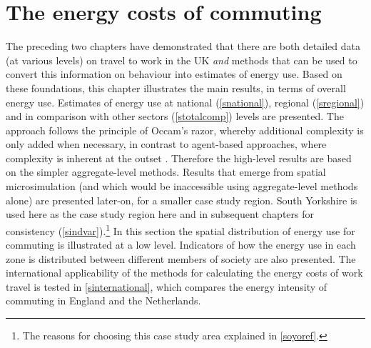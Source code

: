 
\chapter{The energy costs of commuting}
\label{Chapter6}
\fancyhead[RE,LO]{\thepage}
The preceding two chapters have demonstrated that there are both detailed
data (at various levels) on travel to work in the UK \emph{and} methods
that can be used to convert this information on behaviour
into estimates of energy use. Based
on these foundations, this chapter illustrates the main results, in terms
of overall energy use. 
Estimates of
energy use at national (\cref{snational}), regional (\cref{sregional}) and
in comparison with other sectors (\cref{stotalcomp}) levels are presented.
The approach follows the
principle of Occam's razor, whereby additional complexity is only added when
necessary, in contrast to agent-based approaches, where complexity is inherent at the
outset \citep{batty2012perspectives}.
Therefore the high-level results are based on the simpler
aggregate-level methods. Results that emerge from spatial microsimulation
(and which would be inaccessible using aggregate-level methods alone) are presented
later-on, for a smaller case study region. South Yorkshire is used here
as the case study region here and in subsequent chapters for consistency
(\cref{sindvar}).\footnote{The
reasons for choosing this case study area explained in \cref{soyoref}.
}
In this section the spatial distribution of energy use for commuting is
illustrated at a low level. Indicators of how the energy use
in each zone is distributed between different members of society are also
presented.
The international applicability of the
methods for calculating the energy costs of work travel
is tested in \cref{sinternational}, which
compares the energy intensity of commuting in England and the Netherlands.
% 
